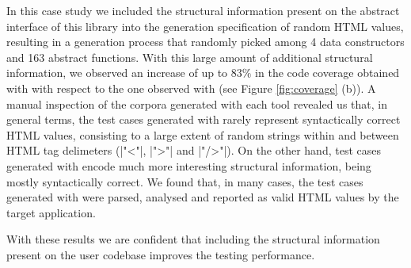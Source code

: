 In this case study we included the structural information present on the abstract
interface of this library into the generation specification of random HTML
values, resulting in a generation process that randomly picked among 4 data
constructors and 163 abstract functions.
%
With this large amount of additional structural information, we observed an
increase of up to $83\%$ in the code coverage obtained with \dragenp with
respect to the one observed with \dragen (see Figure \ref{fig:coverage} (b)).
%
A manual inspection of the corpora generated with each tool revealed us that, in
general terms, the test cases generated with \dragen rarely represent
syntactically correct HTML values, consisting to a large extent of random
strings within and between HTML tag delimeters (|"<"|, |">"| and |"/>"|).
%
On the other hand, test cases generated with \dragenp encode much more
interesting structural information, being mostly syntactically correct.
%
We found that, in many cases, the test cases generated with \dragenp were
parsed, analysed and reported as valid HTML values by the target application.


With these results we are confident that including the structural information
present on the user codebase improves the testing performance.
%
